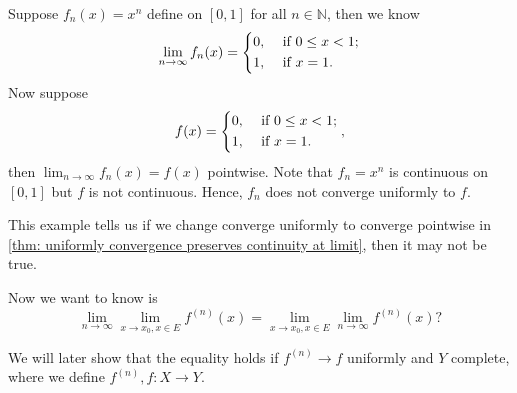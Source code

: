 \begin{eg}
    Suppose \(f_n(x) = x^n\) define on \([0, 1]\) for all \(n \in \mathbb{N} \), then we know 
    \[
        \lim_{n \to \infty} f_n(x) = \begin{dcases}
           0 , &\text{ if }  0 \le x < 1;\\
            1 , &\text{ if } x = 1.
        \end{dcases} 
    \] 
    Now suppose 
    \[
        f(x) = \begin{dcases}
           0 , &\text{ if }  0 \le x < 1;\\
            1 , &\text{ if } x = 1.
        \end{dcases} ,
    \] then \(\lim_{n \to \infty} f_n(x) = f(x) \) pointwise. Note that \(f_n = x^n\) is continuous on \([0, 1]\) but \(f\) is not continuous. Hence, \(f_n\) does not converge uniformly to \(f\).      
\end{eg}

\begin{remark}
    This example tells us if we change converge uniformly to converge pointwise in \autoref{thm: uniformly convergence preserves continuity at limit}, then it may not be true.
\end{remark}

Now we want to know is 
\[
    \lim_{n \to \infty} \lim_{x \to x_0, x \in E} f^{(n)}(x) = \lim_{x \to x_0, x \in E} \lim_{n \to \infty} f^{(n)}(x)?    
\]

We will later show that the equality holds if \(f^{(n)} \to f\) uniformly and \(Y\) complete, where we define \(f^{(n)}, f: X \to Y\). 

